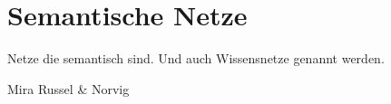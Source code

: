 \chapter{Semantische Netze}
\label{chap:semantische_netze}

Netze die semantisch sind. Und auch Wissensnetze genannt werden.


Mira
Russel \& Norvig

